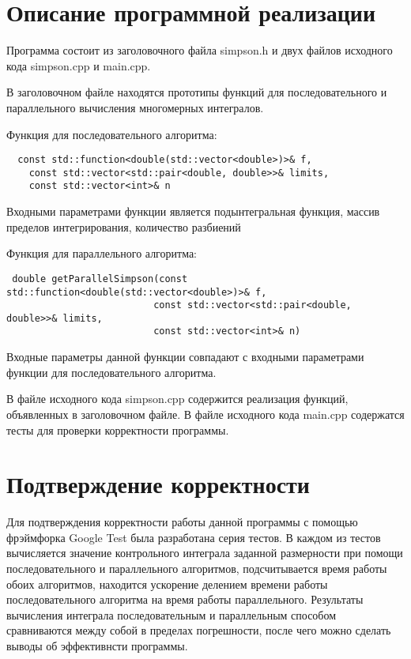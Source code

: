 \documentclass{report}
\begin{document}
\section*{Описание программной реализации}
Программа состоит из заголовочного файла simpson.h и двух файлов исходного кода simpson.cpp и main.cpp.
\par В заголовочном файле находятся прототипы функций для последовательного и параллельного вычисления многомерных интегралов.
\par Функция для последовательного алгоритма:
\begin{lstlisting}
  const std::function<double(std::vector<double>)>& f,
    const std::vector<std::pair<double, double>>& limits,
    const std::vector<int>& n
\end{lstlisting}
Входными параметрами функции является подынтегральная функция, массив пределов интегрирования, количество разбиений
\par Функция для параллельного
алгоритма:
\begin{lstlisting}
 double getParallelSimpson(const std::function<double(std::vector<double>)>& f,
                          const std::vector<std::pair<double, double>>& limits,
                          const std::vector<int>& n)
\end{lstlisting}
Входные параметры данной функции совпадают с входными параметрами функции для последовательного алгоритма.
\par В файле исходного кода simpson.cpp содержится реализация функций, объявленных в заголовочном файле. В файле исходного кода main.cpp содержатся тесты для проверки корректности программы.
\newpage

\section*{Подтверждение корректности}
Для подтверждения корректности работы данной программы с помощью фрэймфорка Google Test была разработана серия тестов. В каждом из тестов вычисляется значение контрольного  интеграла заданной размерности при помощи последовательного и параллельного алгоритмов, подсчитывается время работы обоих алгоритмов, находится ускорение делением времени работы последовательного алгоритма на время работы параллельного. Результаты вычисления интеграла последовательным и параллельным способом сравниваются между собой в пределах погрешности, после чего можно сделать выводы об эффективнсти программы.
\end{document}

